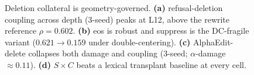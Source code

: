 \begin{figure}[t]
\centering

\caption{Deletion collateral is geometry-governed. \textbf{(a)} refusal-deletion
coupling across depth (3-seed) peaks at L12, above the rewrite reference $\rho{=}0.602$.
\textbf{(b)} eos is robust and suppress is the DC-fragile variant ($0.621\!\to\!0.159$
under double-centering). \textbf{(c)} AlphaEdit-delete collapses both damage and coupling
(3-seed; $\alpha$-damage $\approx0.11$). \textbf{(d)} $S\times C$ beats a lexical
transplant baseline at every cell.}
\label{fig:deletion}
\end{figure}
